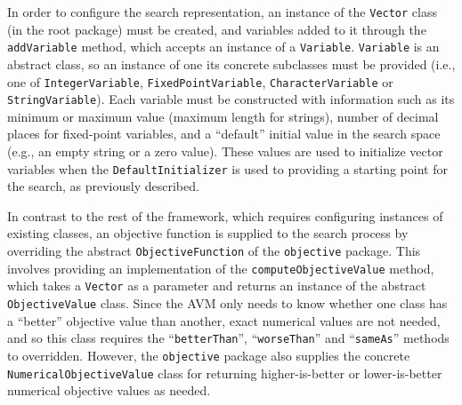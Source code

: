 \documentclass{llncs}
\newcommand{\inlineheading}[1]{\vspace{1mm} \noindent {\bf #1.}}
\begin{document}
\begin{sloppypar}
\inlineheading{Representation} In order to configure the search representation, an instance of the {\tt Vector} class (in the root package) must be created, and variables added to it through the {\tt addVariable} method, which accepts an instance of a {\tt Variable}. {\tt Variable} is an abstract class, so an instance of one its concrete subclasses must be provided (i.e., one of {\tt IntegerVariable}, {\tt FixedPointVariable}, {\tt CharacterVariable} or {\tt StringVariable}). Each variable must be constructed with information such as its minimum or maximum value (maximum length for strings), number of decimal places for fixed-point variables, and a ``default'' initial value in the search space (e.g., an empty string or a zero value). These values are used to initialize vector variables when the {\tt DefaultInitializer} is used to providing a starting point for the search, as previously described.
\end{sloppypar}

\begin{sloppypar}
\inlineheading{Objective Function} In contrast to the rest of the framework, which requires configuring instances of existing classes, an objective function is supplied to the search process by overriding the abstract {\tt ObjectiveFunction} of the {\tt objective} package. This involves providing an implementation of the {\tt computeObjectiveValue} method, which takes a {\tt Vector} as a parameter and returns an instance of the abstract {\tt ObjectiveValue} class. Since the AVM only needs to know whether one class has a ``better'' objective value than another, exact numerical values are not needed, and so this class requires the ``{\tt betterThan}'', ``{\tt worseThan}'' and ``{\tt sameAs}'' methods to overridden.
However, the {\tt objective} package also supplies the concrete {\tt NumericalObjectiveValue} class for returning higher-is-better or lower-is-better numerical objective values as needed.
\end{sloppypar}
\end{document}

